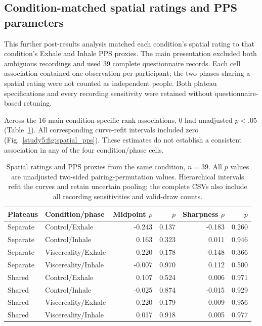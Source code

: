 \subsection{Condition-matched spatial ratings and PPS parameters}

This further post-results analysis matched each condition's spatial rating to that condition's Exhale and Inhale PPS proxies. The main presentation excluded both ambiguous recordings and used 39 complete questionnaire records. Each cell association contained one observation per participant; the two phases sharing a spatial rating were not counted as independent people. Both plateau specifications and every recording sensitivity were retained without questionnaire-based retuning.

Across the 16 main condition-specific rank associations, 0 had unadjusted $p<.05$ (Table~\ref{study5:tab:spatial_pps_cells}). All corresponding curve-refit intervals included zero (Fig.~\ref{study5:fig:spatial_pps}). These estimates do not establish a consistent association in any of the four condition/phase cells.

\begin{table}[htbp]
\centering\small
\begin{tabular}{llrrrr}
Plateaus & Condition/phase & Midpoint $\rho$ & $p$ & Sharpness $\rho$ & $p$ \\
\hline
Separate & Control/Exhale & -0.243 & 0.137 & -0.183 & 0.260 \\
Separate & Control/Inhale & 0.163 & 0.323 & 0.011 & 0.946 \\
Separate & Viscereality/Exhale & 0.220 & 0.178 & -0.148 & 0.366 \\
Separate & Viscereality/Inhale & -0.007 & 0.970 & 0.112 & 0.500 \\
Shared & Control/Exhale & 0.107 & 0.524 & 0.006 & 0.971 \\
Shared & Control/Inhale & -0.025 & 0.874 & -0.015 & 0.929 \\
Shared & Viscereality/Exhale & 0.220 & 0.179 & 0.009 & 0.956 \\
Shared & Viscereality/Inhale & 0.017 & 0.918 & 0.005 & 0.977 \\
\end{tabular}
\caption{Spatial ratings and PPS proxies from the same condition, $n=39$. All $p$ values are unadjusted two-sided pairing-permutation values. Hierarchical intervals refit the curves and retain uncertain pooling; the complete CSVs also include all recording sensitivities and valid-draw counts.}
\label{study5:tab:spatial_pps_cells}
\end{table}

